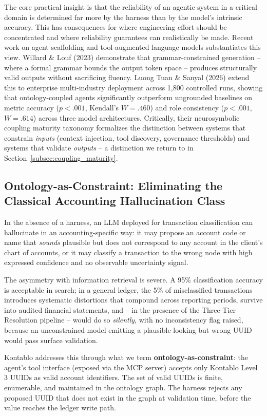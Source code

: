 The core practical insight is that the reliability of an agentic system in a
critical domain is determined far more by the harness than by the model's
intrinsic accuracy. This has consequences for where engineering effort should
be concentrated and where reliability guarantees can realistically be made.
Recent work on agent scaffolding and tool-augmented language models
substantiates this view. Willard \& Louf (2023) demonstrate that
grammar-constrained generation -- where a formal grammar bounds the output
token space -- produces structurally valid outputs without sacrificing fluency.
Luong Tuan \& Sanyal (2026) extend this to enterprise multi-industry deployment
across 1,800 controlled runs, showing that ontology-coupled agents significantly
outperform ungrounded baselines on metric accuracy ($p < .001$, Kendall's $W =
.460$) and role consistency ($p < .001$, $W = .614$) across three model
architectures. Critically, their neurosymbolic coupling maturity taxonomy
formalizes the distinction between systems that constrain \emph{inputs} (context
injection, tool discovery, governance thresholds) and systems that validate
\emph{outputs} -- a distinction we return to in Section~\ref{subsec:coupling_maturity}.

\subsection{Ontology-as-Constraint: Eliminating the Classical Accounting
Hallucination Class}
\label{subsec:ontology_constraint}

In the absence of a harness, an LLM deployed for transaction classification
can hallucinate in an accounting-specific way: it may propose an account code
or name that \emph{sounds} plausible but does not correspond to any account in
the client's chart of accounts, or it may classify a transaction to the wrong
node with high expressed confidence and no observable uncertainty signal.

The asymmetry with information retrieval is severe. A 95\% classification
accuracy is acceptable in search; in a general ledger, the 5\% of
misclassified transactions introduces systematic distortions that compound
across reporting periods, survive into audited financial statements, and --
in the presence of the Three-Tier Resolution pipeline -- would do so
\emph{silently}, with no inconsistency flag raised, because an unconstrained
model emitting a plausible-looking but wrong UUID would pass surface validation.

Kontablo addresses this through what we term \textbf{ontology-as-constraint}:
the agent's tool interface (exposed via the MCP server) accepts only Kontablo
Level 3 UUIDs as valid account identifiers. The set of valid UUIDs is finite,
enumerable, and maintained in the ontology graph. The harness rejects any
proposed UUID that does not exist in the graph at validation time, before
the value reaches the ledger write path.

